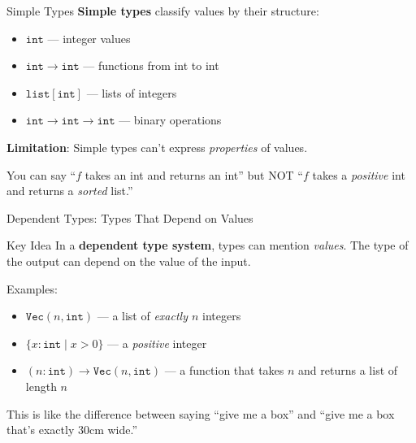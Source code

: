 \documentclass[aspectratio=169,11pt]{beamer}
\begin{document}
\begin{frame}{Simple Types}
\textbf{Simple types} classify values by their structure:

\begin{itemize}
\item $\mathtt{int}$ --- integer values
\item $\mathtt{int} \to \mathtt{int}$ --- functions from int to int
\item $\mathtt{list[int]}$ --- lists of integers
\item $\mathtt{int} \to \mathtt{int} \to \mathtt{int}$ --- binary operations
\end{itemize}

\vspace{0.5em}
\textbf{Limitation}: Simple types can't express \emph{properties}
of values.

You can say ``$f$ takes an int and returns an int'' but NOT
``$f$ takes a \emph{positive} int and returns a \emph{sorted} list.''
\end{frame}

\begin{frame}{Dependent Types: Types That Depend on Values}
\begin{block}{Key Idea}
In a \textbf{dependent type system}, types can mention \emph{values}.
The type of the output can depend on the value of the input.
\end{block}

\vspace{0.5em}
Examples:
\begin{itemize}
\item $\mathtt{Vec}(n, \mathtt{int})$ --- a list of \emph{exactly $n$} integers
\item $\{x : \mathtt{int} \mid x > 0\}$ --- a \emph{positive} integer
\item $(n : \mathtt{int}) \to \mathtt{Vec}(n, \mathtt{int})$ --- a function
  that takes $n$ and returns a list of length $n$
\end{itemize}

\vspace{0.5em}
This is like the difference between saying ``give me a box''
and ``give me a box that's exactly 30cm wide.''
\end{frame}
\end{document}

